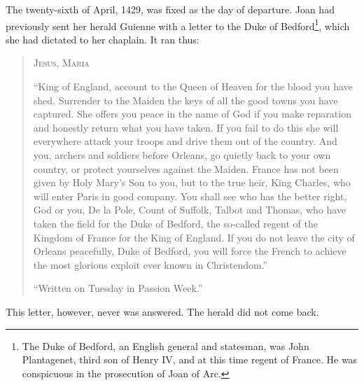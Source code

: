 The twenty-sixth of April, 1429, was fixed as the day of departure. Joan
had previously sent her herald Guienne with a letter to the Duke of
Bedford\footnote{The Duke of Bedford, an English general and statesman,
  was John Plantagenet, third son of Henry IV, and at this time regent
  of France. He was conspicuous in the prosecution of Joan of Arc.},
which she had dictated to her chaplain. It ran thus:

\begin{quote}
\begin{center}
\textsc{\normalsize Jesus, Maria}
\end{center}

“King of England, account to the Queen of Heaven for the blood you
have shed. Surrender to the Maiden the keys of all the good towns you
have captured. She offers you peace in the name of God if you make
reparation and honestly return what you have taken. If you fail to do
this she will everywhere attack your troops and drive them out of the
country. And you, archers and soldiers before Orleans, go quietly back
to your own country, or protect yourselves against the Maiden. France
has not been given by Holy Mary’s Son to you, but to the true heir,
King Charles, who will enter Paris in good company. You shall see who
has the better right, God or you, De la Pole, Count of Suffolk, Talbot
and Thomas, who have taken the field for the Duke of Bedford, the
so-called regent of the Kingdom of France for the King of England. If
you do not leave the city of Orleans peacefully, Duke of Bedford, you
will force the French to achieve the most glorious exploit ever known
in Christendom.”

\begin{center}
“Written on Tuesday in Passion Week.”
\end{center}
\end{quote}

This letter, however, never was answered. The herald did not come back.

